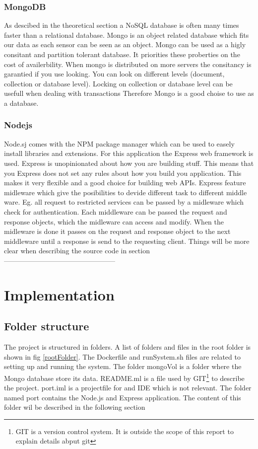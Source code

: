 \documentclass[a4paper,12pt,english]{article}
\begin{document}
\subsubsection{MongoDB}
As descibed in the theoretical section a NoSQL database is often many times
faster than a relational database\cite{mongotest}. Mongo is an object related
database which fits our data as each sensor can be seen as an object. Mongo can be used as a
higly consitant and partition tolerant database. It priorities these proberties
on the cost of availerbility. When mongo is distributed on more servers the
consitancy is garantied if you use looking. You can look on different levels
(document, collection or database level). Locking on collection or
database level can be usefull when dealing with transactions \cite{mongoManual}
Therefore Mongo is a good choise to use as a database.


\subsubsection{Nodejs}
Node.sj comes with the NPM package
manager which can be used to easely install libraries and extensions. For this
application the Express web framework is used. Express is
unopinionated about how you are building stuff. This means that you Express
does not set any rules about how you build you application. This makes it very
flexible and a good choice for building web APIs. Express feature midleware
which give the posibilities to devide different task to different middle ware.
Eg. all request to restricted services can be passed by a midleware which check
for authentication. Each middleware can be passed the request and response
objects, which the midleware can access and modify. When the midleware is done
it passes on the request and response object to the next middleware until a
response is send to the requesting client.
Things will be more clear when describing the source code in section
------------------------------------------------

\section{Implementation}
\subsection{Folder structure}
The project is structured in folders. A list of folders and files in the root
folder is shown in fig \ref{rootFolder}. The Dockerfile and runSystem.sh
files are related to setting up and running the system. The folder mongoVol
is a folder where the Mongo database store its data. README.ml is a file used by
GIT\footnote{GIT is a version control system. It is outside the scope of this
report to explain details abput git} to describe the project. port.iml is a
projectfile for and IDE which is not relevant. The folder named port
contains the Node.js and Express application. The content of this folder wil be
described in the following section
\end{document}
